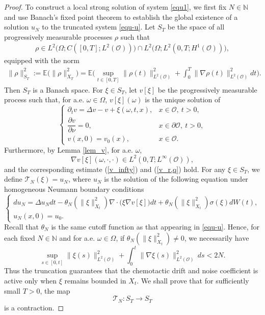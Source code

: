 \documentclass[reqno, 11pt]{amsart}
\theoremstyle{definition}
\numberwithin{equation}{section} \numberwithin{lem}{section}
\numberwithin{thm}{section} \numberwithin{prop}{section}
\numberwithin{cor}{section} \numberwithin{rem}{section}
\numberwithin{defn}{section}
\begin{document}
\begin{proof}
To construct a local strong solution of system \eqref{equ1}, we first fix
\(N\in\mathbb N\) and use Banach's fixed point theorem to establish the
global existence of a solution \(u_N\) to the truncated system \eqref{equ-u}.
Let $S_T$ be the space of all progressively measurable processes $\rho$
such that 
\begin{align*}
   \rho\in L^2\big(\Omega;C([0,T];L^2(\mathcal O))\big)
\cap
L^2\big(\Omega;L^2(0,T;H^1(\mathcal O))\big), 
\end{align*}
equipped with the norm
\begin{align*}
  \|\rho\|_{S_T}^2
:=\mathbb{E}\big(\|\rho\|_{X_T}^2\big)=
\mathbb E\Big(
\sup_{t\in[0,T]}\|\rho(t)\|_{L^2(\mathcal O)}^2
+
\int_0^T\|\nabla \rho (t)\|_{L^2(\mathcal O)}^2dt\Big).  
\end{align*}
Then $S_T$ is a Banach space. 
	For \(\xi\in S_T\), let \(v[\xi]\) be the progressively measurable process
		such that, for a.e. \(\omega\in\Omega\), \(v[\xi](\omega)\) is the unique
		solution of
		\begin{equation}\label{equ-v}
			\begin{cases}
				\partial_t v=\Delta v-v+\xi(\omega,t,x),
				& x\in\mathcal O,\ t>0,\\
				\dfrac{\partial v}{\partial\nu}=0,
				& x\in\partial\mathcal O,\ t>0,\\
				v(x,0)=v_0(x),
				& x\in\mathcal O.
			\end{cases}
		\end{equation}
        Furthermore, by Lemma \ref{lem_v},  for a.e. $\omega$,  \[
\nabla v[\xi](\omega,\cdot,\cdot)\in L^2(0,T;L^\infty (\mathcal {O})),
\] and the corresponding estimate (\ref{v_infty}) and (\ref{v_r,q}) hold.
For any $\xi\in S_T$, we define $\mathcal T_N(\xi)=u_N$, where $u_N$ is the solution of the following  equation under homogeneous Neumann boundary conditions
\begin{equation}\label{equ-u_1}
\begin{cases}
du_N=\Delta u_Ndt-\theta_N(\|\xi\|_{X_t}^2)\nabla\cdot\big(\xi\nabla v[\xi]\big)dt+\theta_N(\|\xi\|_{X_t}^2)\sigma(\xi)dW(t),\\
u_N(x,0)=u_0.
\end{cases}
\end{equation}
Recall that  $\theta_N$ is the same cutoff function as that appearing in
\eqref{equ-u}. Hence,  for each fixed $N\in\mathbb N$ and for a.e. $\omega\in\Omega$, if $\theta_N(\|\xi\|_{X_t}^2)\neq0$,  we necessarily have $$\sup_{s\in[0,t]}\|\xi(s)\|_{L^2(\mathcal {O})}^2+\int_0^t\|\nabla \xi(s)\|_{L^2(\mathcal {O})}^2\,ds< 2N.$$
Thus the truncation guarantees that the chemotactic drift and noise coefficient is active only when $\xi $ remains bounded in $X_t$. 
 We shall prove that for sufficiently small $T>0$, the map $$\mathcal{T}_N:S_T\to S_T$$ is a contraction. 
 

\end{proof}
\end{document}
